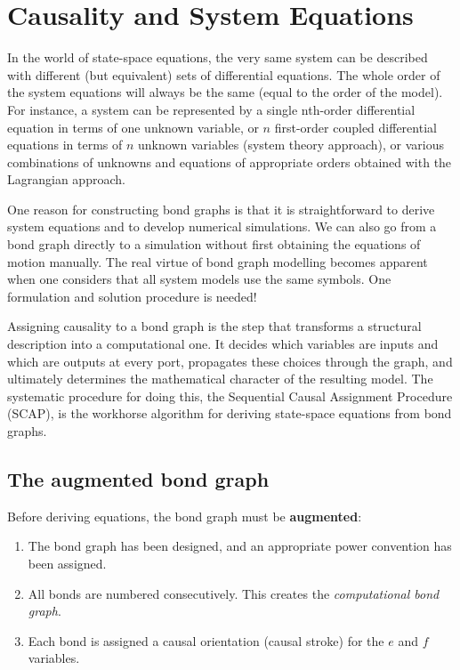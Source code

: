 \chapter{Causality and System Equations}
\label{ch:causality}

In the world of state-space equations, the very same system can be described with different (but equivalent) sets of differential equations. The whole order of the system equations will always be the same (equal to the order of the model). For instance, a system can be represented by a single nth-order differential equation in terms of one unknown variable, or $n$ first-order coupled differential equations in terms of $n$ unknown variables (system theory approach), or various combinations of unknowns and equations of appropriate orders obtained with the Lagrangian approach. 

One reason for constructing bond graphs is that it is straightforward to derive system equations and to develop numerical simulations. We can also go from a bond graph directly to a simulation without first obtaining the equations of motion manually. The real virtue of bond graph modelling becomes apparent when one considers that all system models use the same symbols. One formulation and solution procedure is needed!

Assigning causality to a bond graph is the step that transforms a structural description into a computational one. It decides which variables are inputs and which are outputs at every port, propagates these choices through the graph, and ultimately determines the mathematical character of the resulting model. The systematic procedure for doing this, the Sequential Causal Assignment Procedure (SCAP), is the workhorse algorithm for deriving state-space equations from bond graphs.

\section{The augmented bond graph}

Before deriving equations, the bond graph must be \textbf{augmented}: 
\begin{enumerate}
  \item The bond graph has been designed, and an appropriate power convention has been assigned.
  \item All bonds are numbered consecutively. This creates the \emph{computational bond graph}.
  \item Each bond is assigned a causal orientation (causal stroke) for the $e$ and $f$ variables.
\end{enumerate}

